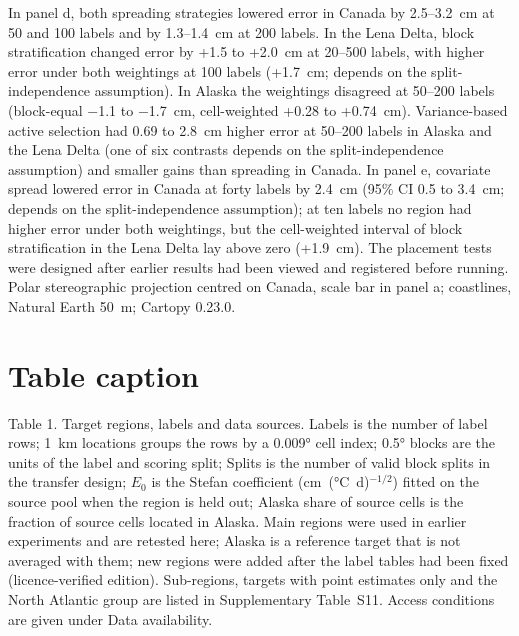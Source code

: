 In panel d, both spreading strategies lowered error in Canada by 2.5--3.2~cm at 50 and 100 labels and by 1.3--1.4~cm at 200 labels.
In the Lena Delta, block stratification changed error by +1.5 to +2.0~cm at 20--500 labels, with higher error under both weightings at 100 labels (+1.7~cm; depends on the split-independence assumption).
In Alaska the weightings disagreed at 50--200 labels (block-equal −1.1 to −1.7~cm, cell-weighted +0.28 to +0.74~cm).
Variance-based active selection had 0.69 to 2.8~cm higher error at 50--200 labels in Alaska and the Lena Delta (one of six contrasts depends on the split-independence assumption) and smaller gains than spreading in Canada.
In panel e, covariate spread lowered error in Canada at forty labels by 2.4~cm (95\% CI 0.5 to 3.4~cm; depends on the split-independence assumption); at ten labels no region had higher error under both weightings, but the cell-weighted interval of block stratification in the Lena Delta lay above zero (+1.9~cm).
The placement tests were designed after earlier results had been viewed and registered before running.
Polar stereographic projection centred on Canada, scale bar in panel a; coastlines, Natural Earth 50~m; Cartopy 0.23.0.

\medskip

\section*{Table caption}

\noindent Table 1. Target regions, labels and data sources.
Labels is the number of label rows; 1~km locations groups the rows by a 0.009° cell index; 0.5° blocks are the units of the label and scoring split; Splits is the number of valid block splits in the transfer design; $E_0$ is the Stefan coefficient (cm~(°C~d)$^{-1/2}$) fitted on the source pool when the region is held out; Alaska share of source cells is the fraction of source cells located in Alaska.
Main regions were used in earlier experiments and are retested here; Alaska is a reference target that is not averaged with them; new regions were added after the label tables had been fixed (licence-verified edition).
Sub-regions, targets with point estimates only and the North Atlantic group are listed in Supplementary Table~S11.
Access conditions are given under Data availability.
